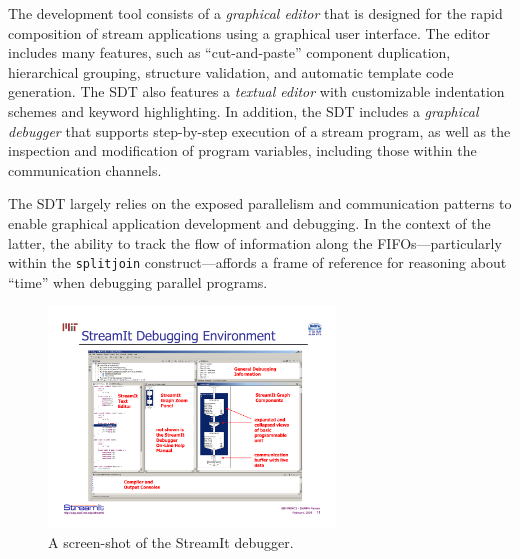 \documentclass{csailabstractbook}
\begin{document}

The  development tool  consists of  a {\it  graphical editor}  that is
designed  for the  rapid composition  of stream  applications  using a
graphical user  interface. The editor includes many  features, such as
``cut-and-paste''   component   duplication,  hierarchical   grouping,
structure validation, and automatic  template code generation. The SDT
also  features a  {\it textual  editor} with  customizable indentation
schemes  and keyword highlighting.   In addition,  the SDT  includes a
{\it  graphical debugger}  that supports  step-by-step execution  of a
stream program, as well as  the inspection and modification of program
variables, including those within the communication channels.

The  SDT largely relies  on the  exposed parallelism  and communication
patterns to enable graphical application development and debugging. In
the  context  of  the  latter,  the  ability  to  track  the  flow  of
information along the  FIFOs---particularly within the {\tt splitjoin}
construct---affords a frame of  reference for reasoning about ``time''
when debugging parallel programs.


\begin{figure}[tbh]
  \centerline{\includegraphics[width=3.0in, angle=270]{kuo_figure1.pdf}}
  \caption{A screen-shot of the StreamIt debugger.} 
  \label{kuo_figure1}
\end{figure}
\end{document}
